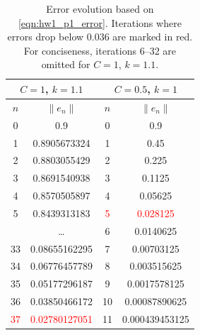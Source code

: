 \begin{table}[!ht]
    \centering
    \begin{tabular}{|c|c|c|c|}
        \hline
        \multicolumn{2}{|c|}{$C=1$, $k=1.1$} & \multicolumn{2}{|c|}{$C=0.5$, $k=1$} \\
        \hline
        $n$ & $ \|e_n \| $ & $n$ & $\|e_n \|$ \\
        \hline
        0 & 0.9 & 0 & 0.9 \\
        \hline 
        1 & 0.8905673324 & 1 & 0.45 \\
        \hline 
        2 & 0.8803055429 & 2 & 0.225 \\
        \hline 
        3 & 0.8691540938 & 3 & 0.1125 \\
        \hline 
        4 & 0.8570505897 & 4 & 0.05625 \\
        \hline 
        5 & 0.8439313183 & \textcolor{red}{5} & \textcolor{red}{0.028125} \\
        \hline 
          & \ldots & 6 & 0.0140625 \\
        \hline 
        33 & 0.08655162295 & 7 & 0.00703125 \\
        \hline 
        34 & 0.06776457789 & 8 & 0.003515625 \\
        \hline 
        35 & 0.05177296187 & 9 & 0.0017578125 \\
        \hline 
        36 & 0.03850466172 & 10 & 0.00087890625 \\
        \hline 
        \textcolor{red}{37} & \textcolor{red}{0.02780127051} & 11 & 0.000439453125 \\
        \hline 
    \end{tabular}
    \caption{
        Error evolution based on \cref{eqn:hw1_p1_error}. Iterations where errors drop below $0.036$ are marked in red. 
        For conciseness, iterations 6--32 are omitted for $C = 1$, $k = 1.1$.
    }
    \label{tab:hw1_p1_error}
\end{table}

